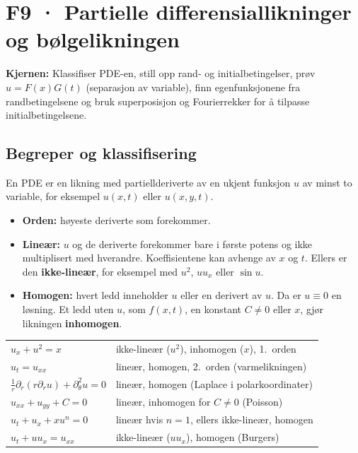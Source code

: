 \section{F9 · Partielle differensiallikninger og bølgelikningen}

\textbf{Kjernen:} Klassifiser PDE-en, still opp rand- og initialbetingelser, prøv $u=F(x)G(t)$ (separasjon av variable), finn egenfunksjonene fra randbetingelsene og bruk superposisjon og Fourierrekker for å tilpasse initialbetingelsene.

\subsection{Begreper og klassifisering}
\begin{defn}
En PDE er en likning med partiellderiverte av en ukjent funksjon $u$ av minst to variable, for eksempel $u(x,t)$ eller $u(x,y,t)$.
\begin{itemize}
  \item \textbf{Orden:} høyeste deriverte som forekommer.
  \item \textbf{Lineær:} $u$ og de deriverte forekommer bare i første potens og ikke multiplisert med hverandre. Koeffisientene kan avhenge av $x$ og $t$. Ellers er den \textbf{ikke-lineær}, for eksempel med $u^2$, $uu_x$ eller $\sin u$.
  \item \textbf{Homogen:} hvert ledd inneholder $u$ eller en derivert av $u$. Da er $u\equiv0$ en løsning. Et ledd uten $u$, som $f(x,t)$, en konstant $C\neq0$ eller $x$, gjør likningen \textbf{inhomogen}.
\end{itemize}
\end{defn}
\begin{eksempel}
\begin{tabular}{@{}ll@{}}
$u_x+u^2=x$ & ikke-lineær ($u^2$), inhomogen ($x$), 1.\ orden\\
$u_t=u_{xx}$ & lineær, homogen, 2.\ orden (varmelikningen)\\
$\frac1r\partial_r(r\partial_ru)+\partial_\theta^2u=0$ & lineær, homogen (Laplace i polarkoordinater)\\
$u_{xx}+u_{yy}+C=0$ & lineær, inhomogen for $C\neq0$ (Poisson)\\
$u_t+u_x+xu^n=0$ & lineær hvis $n=1$, ellers ikke-lineær, homogen\\
$u_t+uu_x=u_{xx}$ & ikke-lineær ($uu_x$), homogen (Burgers)
\end{tabular}
\end{eksempel}

